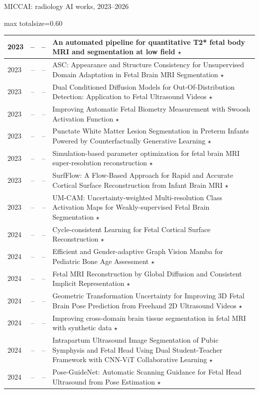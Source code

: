 \documentclass[aspectratio=169]{beamer}
\begin{document}
\begin{frame}[category=Conferences]{MICCAI: radiology AI works, 2023--2026}
\begin{adjustbox}{max totalsize={\textwidth}{0.60\textheight}}
\begin{tabular}{|l|r|r|>{\raggedright\arraybackslash}p{}|}
2023 & -- & -- & An automated pipeline for quantitative T2* fetal body MRI and segmentation at low field $\star$ \\ \hline
2023 & -- & -- & ASC: Appearance and Structure Consistency for Unsupervised Domain Adaptation in Fetal Brain MRI Segmentation $\star$ \\ \hline
2023 & -- & -- & Dual Conditioned Diffusion Models for Out-Of-Distribution Detection: Application to Fetal Ultrasound Videos $\star$ \\ \hline
2023 & -- & -- & Improving Automatic Fetal Biometry Measurement with Swoosh Activation Function $\star$ \\ \hline
2023 & -- & -- & Punctate White Matter Lesion Segmentation in Preterm Infants Powered by Counterfactually Generative Learning $\star$ \\ \hline
2023 & -- & -- & Simulation-based parameter optimization for fetal brain MRI super-resolution reconstruction $\star$ \\ \hline
2023 & -- & -- & SurfFlow: A Flow-Based Approach for Rapid and Accurate Cortical Surface Reconstruction from Infant Brain MRI $\star$ \\ \hline
2023 & -- & -- & UM-CAM: Uncertainty-weighted Multi-resolution Class Activation Maps for Weakly-supervised Fetal Brain Segmentation $\star$ \\ \hline
2024 & -- & -- & Cycle-consistent Learning for Fetal Cortical Surface Reconstruction $\star$ \\ \hline
2024 & -- & -- & Efficient and Gender-adaptive Graph Vision Mamba for Pediatric Bone Age Assessment $\star$ \\ \hline
2024 & -- & -- & Fetal MRI Reconstruction by Global Diffusion and Consistent Implicit Representation $\star$ \\ \hline
2024 & -- & -- & Geometric Transformation Uncertainty for Improving 3D Fetal Brain Pose Prediction from Freehand 2D Ultrasound Videos $\star$ \\ \hline
2024 & -- & -- & Improving cross-domain brain tissue segmentation in fetal MRI with synthetic data $\star$ \\ \hline
2024 & -- & -- & Intrapartum Ultrasound Image Segmentation of Pubic Symphysis and Fetal Head Using Dual Student-Teacher Framework with CNN-ViT Collaborative Learning $\star$ \\ \hline
2024 & -- & -- & Pose-GuideNet: Automatic Scanning Guidance for Fetal Head Ultrasound from Pose Estimation $\star$ \\ \hline

\end{tabular}
\end{adjustbox}
\end{frame}
\end{document}
